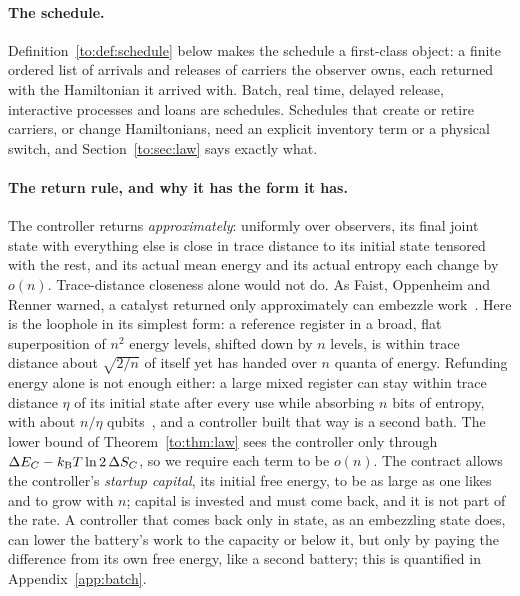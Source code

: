 \paragraph{The schedule.} Definition~\ref{to:def:schedule} below makes the schedule a first-class object: a finite ordered list of arrivals and releases of carriers the observer owns, each returned with the Hamiltonian it arrived with. Batch, real time, delayed release, interactive processes and loans are schedules. Schedules that create or retire carriers, or change Hamiltonians, need an explicit inventory term or a physical switch, and Section~\ref{to:sec:law} says exactly what.

\paragraph{The return rule, and why it has the form it has.} The controller returns \emph{approximately}: uniformly over observers, its final joint state with everything else is close in trace distance to its initial state tensored with the rest, and its actual mean energy and its actual entropy each change by $o(n)$. Trace-distance closeness alone would not do. As Faist, Oppenheim and Renner warned, a catalyst returned only approximately can embezzle work~\cite{FOR15}. Here is the loophole in its simplest form: a reference register in a broad, flat superposition of $n^2$ energy levels, shifted down by $n$ levels, is within trace distance about $\sqrt{2/n}$ of itself yet has handed over $n$ quanta of energy. Refunding energy alone is not enough either: a large mixed register can stay within trace distance $\eta$ of its initial state after every use while absorbing $n$ bits of entropy, with about $n/\eta$ qubits~\cite{Mausberg26}, and a controller built that way is a second bath. The lower bound of Theorem~\ref{to:thm:law} sees the controller only through $\Delta E_C-k_{\mathrm B} T\ln2\,\Delta S_C$, so we require each term to be $o(n)$. The contract allows the controller's \emph{startup capital}, its initial free energy, to be as large as one likes and to grow with $n$; capital is invested and must come back, and it is not part of the rate. A controller that comes back only in state, as an embezzling state does, can lower the battery's work to the capacity or below it, but only by paying the difference from its own free energy, like a second battery; this is quantified in Appendix~\ref{app:batch}.

